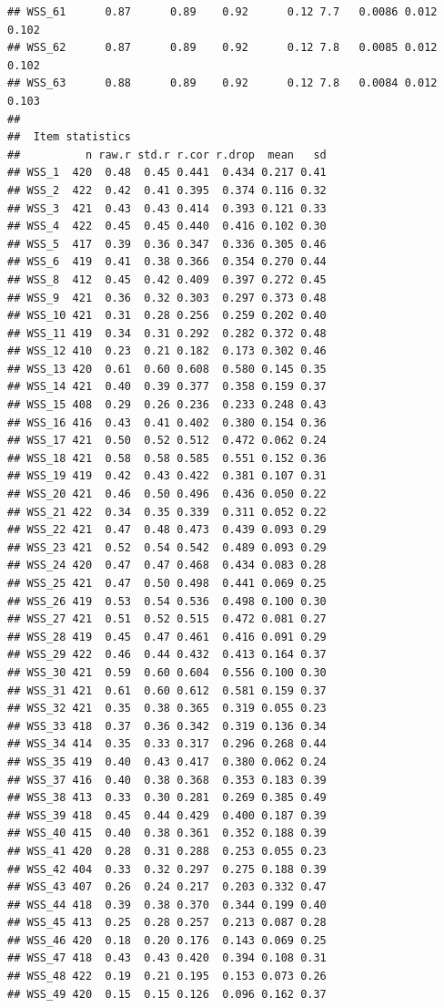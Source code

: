 \documentclass[
]{article}
\begin{document}
\begin{verbatim}
## WSS_61      0.87      0.89    0.92      0.12 7.7   0.0086 0.012 0.102
## WSS_62      0.87      0.89    0.92      0.12 7.8   0.0085 0.012 0.102
## WSS_63      0.88      0.89    0.92      0.12 7.8   0.0084 0.012 0.103
## 
##  Item statistics 
##          n raw.r std.r r.cor r.drop  mean   sd
## WSS_1  420  0.48  0.45 0.441  0.434 0.217 0.41
## WSS_2  422  0.42  0.41 0.395  0.374 0.116 0.32
## WSS_3  421  0.43  0.43 0.414  0.393 0.121 0.33
## WSS_4  422  0.45  0.45 0.440  0.416 0.102 0.30
## WSS_5  417  0.39  0.36 0.347  0.336 0.305 0.46
## WSS_6  419  0.41  0.38 0.366  0.354 0.270 0.44
## WSS_8  412  0.45  0.42 0.409  0.397 0.272 0.45
## WSS_9  421  0.36  0.32 0.303  0.297 0.373 0.48
## WSS_10 421  0.31  0.28 0.256  0.259 0.202 0.40
## WSS_11 419  0.34  0.31 0.292  0.282 0.372 0.48
## WSS_12 410  0.23  0.21 0.182  0.173 0.302 0.46
## WSS_13 420  0.61  0.60 0.608  0.580 0.145 0.35
## WSS_14 421  0.40  0.39 0.377  0.358 0.159 0.37
## WSS_15 408  0.29  0.26 0.236  0.233 0.248 0.43
## WSS_16 416  0.43  0.41 0.402  0.380 0.154 0.36
## WSS_17 421  0.50  0.52 0.512  0.472 0.062 0.24
## WSS_18 421  0.58  0.58 0.585  0.551 0.152 0.36
## WSS_19 419  0.42  0.43 0.422  0.381 0.107 0.31
## WSS_20 421  0.46  0.50 0.496  0.436 0.050 0.22
## WSS_21 422  0.34  0.35 0.339  0.311 0.052 0.22
## WSS_22 421  0.47  0.48 0.473  0.439 0.093 0.29
## WSS_23 421  0.52  0.54 0.542  0.489 0.093 0.29
## WSS_24 420  0.47  0.47 0.468  0.434 0.083 0.28
## WSS_25 421  0.47  0.50 0.498  0.441 0.069 0.25
## WSS_26 419  0.53  0.54 0.536  0.498 0.100 0.30
## WSS_27 421  0.51  0.52 0.515  0.472 0.081 0.27
## WSS_28 419  0.45  0.47 0.461  0.416 0.091 0.29
## WSS_29 422  0.46  0.44 0.432  0.413 0.164 0.37
## WSS_30 421  0.59  0.60 0.604  0.556 0.100 0.30
## WSS_31 421  0.61  0.60 0.612  0.581 0.159 0.37
## WSS_32 421  0.35  0.38 0.365  0.319 0.055 0.23
## WSS_33 418  0.37  0.36 0.342  0.319 0.136 0.34
## WSS_34 414  0.35  0.33 0.317  0.296 0.268 0.44
## WSS_35 419  0.40  0.43 0.417  0.380 0.062 0.24
## WSS_37 416  0.40  0.38 0.368  0.353 0.183 0.39
## WSS_38 413  0.33  0.30 0.281  0.269 0.385 0.49
## WSS_39 418  0.45  0.44 0.429  0.400 0.187 0.39
## WSS_40 415  0.40  0.38 0.361  0.352 0.188 0.39
## WSS_41 420  0.28  0.31 0.288  0.253 0.055 0.23
## WSS_42 404  0.33  0.32 0.297  0.275 0.188 0.39
## WSS_43 407  0.26  0.24 0.217  0.203 0.332 0.47
## WSS_44 418  0.39  0.38 0.370  0.344 0.199 0.40
## WSS_45 413  0.25  0.28 0.257  0.213 0.087 0.28
## WSS_46 420  0.18  0.20 0.176  0.143 0.069 0.25
## WSS_47 418  0.43  0.43 0.420  0.394 0.108 0.31
## WSS_48 422  0.19  0.21 0.195  0.153 0.073 0.26
## WSS_49 420  0.15  0.15 0.126  0.096 0.162 0.37

\end{verbatim}
\end{document}
